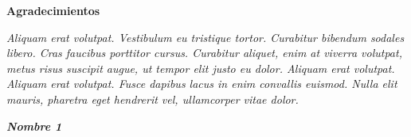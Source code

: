
\begin{center}

\textbf{}

\vspace{3cm}

\Large{\textbf{Agradecimientos\\}}

\vspace{2cm}

 \normalsize{
 \textit{
Aliquam erat volutpat. Vestibulum eu tristique tortor. Curabitur bibendum sodales libero. Cras faucibus porttitor cursus. Curabitur aliquet, enim at viverra volutpat, metus risus suscipit augue, ut tempor elit justo eu dolor. Aliquam erat volutpat. Aliquam erat volutpat. Fusce dapibus lacus in enim convallis euismod. Nulla elit mauris, pharetra eget hendrerit vel, ullamcorper vitae dolor.
 }
}

\end{center}

\vspace{3cm}

\begin{flushright}

\textit{\textbf{Nombre 1}}

\end{flushright}

\pagestyle{empty}

